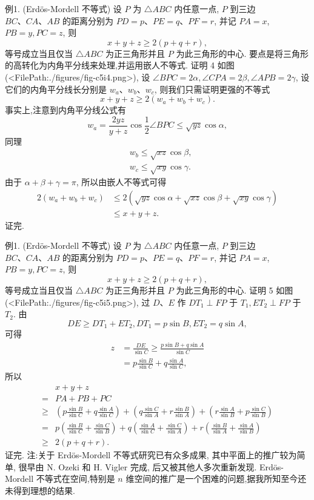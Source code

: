 例1. (Erdös-Mordell 不等式) 设 $P$ 为 $\triangle A B C$ 内任意一点, $P$ 到三边 $B C 、 C A 、 A B$ 的距离分别为 $P D=p 、 P E=q 、 P F=r$, 并记 $P A=x$, $P B=y, P C=z$, 则
$$
x+y+z \geqslant 2(p+q+r),
$$
等号成立当且仅当 $\triangle A B C$ 为正三角形并且 $P$ 为此三角形的中心.
要点是将三角形的高转化为内角平分线来处理,并运用嵌人不等式.
证明 4 如图(<FilePath:./figures/fig-c5i4.png>), 设 $\angle B P C=2 \alpha, \angle C P A=2 \beta, \angle A P B=2 \gamma$, 设它们的内角平分线长分别是 $w_a 、 w_b 、 w_c$, 则我们只需证明更强的不等式
$$
x+y+z \geqslant 2\left(w_a+w_b+w_c\right) .
$$
事实上,注意到内角平分线公式有
$$
w_a=\frac{2 y z}{y+z} \cos \frac{1}{2} \angle B P C \leqslant \sqrt{y z} \cos \alpha,
$$
同理
$$
\begin{aligned}
& w_b \leqslant \sqrt{x z} \cos \beta, \\
& w_c \leqslant \sqrt{x y} \cos \gamma .
\end{aligned}
$$
由于 $\alpha+\beta+\gamma=\pi$, 所以由嵌人不等式可得
$$
\begin{aligned}
2\left(w_a+w_b+w_c\right) & \leqslant 2(\sqrt{y z} \cos \alpha+\sqrt{x z} \cos \beta+\sqrt{x y} \cos \gamma) \\
& \leqslant x+y+z .
\end{aligned}
$$
证完.



例1. (Erdös-Mordell 不等式) 设 $P$ 为 $\triangle A B C$ 内任意一点, $P$ 到三边 $B C 、 C A 、 A B$ 的距离分别为 $P D=p 、 P E=q 、 P F=r$, 并记 $P A=x$, $P B=y, P C=z$, 则
$$
x+y+z \geqslant 2(p+q+r),
$$
等号成立当且仅当 $\triangle A B C$ 为正三角形并且 $P$ 为此三角形的中心.
证明 5 如图(<FilePath:./figures/fig-c5i5.png>), 过 $D 、 E$ 作 $D T_1 \perp F P$ 于 $T_1, E T_2 \perp F P$ 于 $T_2$. 由
$$
D E \geqslant D T_1+E T_2, D T_1=p \sin B, E T_2=q \sin A,
$$
可得
$$
\begin{aligned}
z & =\frac{D E}{\sin C} \geqslant \frac{p \sin B+q \sin A}{\sin C} \\
& =p \frac{\sin B}{\sin C}+q \frac{\sin A}{\sin C},
\end{aligned}
$$
所以
$$
\begin{aligned}
& x+y+z \\
= & P A+P B+P C \\
\geqslant & \left(p \frac{\sin B}{\sin C}+q \frac{\sin A}{\sin C}\right)+\left(q \frac{\sin C}{\sin A}+r \frac{\sin B}{\sin A}\right)+\left(r \frac{\sin A}{\sin B}+p \frac{\sin C}{\sin B}\right) \\
= & p\left(\frac{\sin B}{\sin C}+\frac{\sin C}{\sin B}\right)+q\left(\frac{\sin A}{\sin C}+\frac{\sin C}{\sin A}\right)+r\left(\frac{\sin B}{\sin A}+\frac{\sin A}{\sin B}\right) \\
\geqslant & 2(p+q+r) .
\end{aligned}
$$
证完.
注:关于 Erdös-Mordell 不等式研究已有众多成果, 其中平面上的推广较为简单, 很早由 N. Ozeki 和 H. Vigler 完成, 后又被其他人多次重新发现.
Erdös-Mordell 不等式在空间,特别是 $n$ 维空间的推广是一个困难的问题,据我所知至今还未得到理想的结果.



